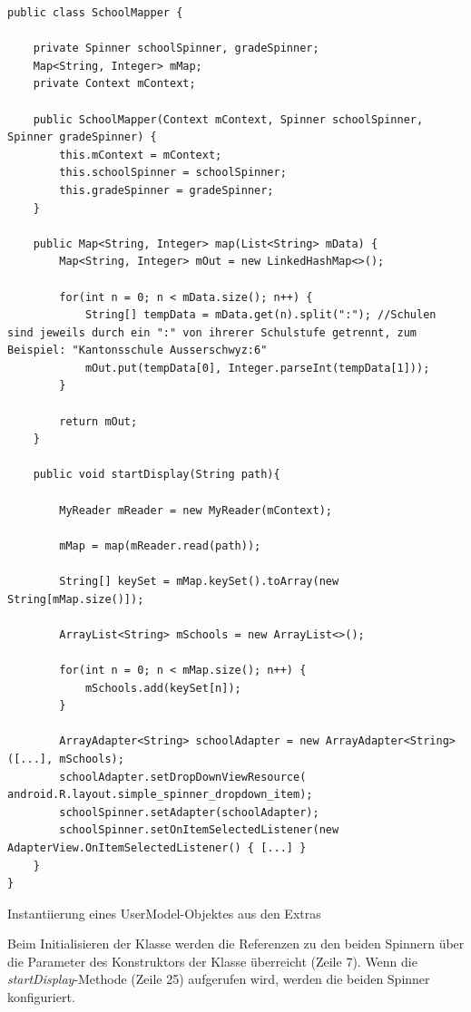 \documentclass[../main.tex]{subfiles}
\begin{document}
\begin{code}
	\begin{center}
		\begin{verbatim}
public class SchoolMapper {

	private Spinner schoolSpinner, gradeSpinner;
	Map<String, Integer> mMap;
	private Context mContext;

	public SchoolMapper(Context mContext, Spinner schoolSpinner, Spinner gradeSpinner) {
		this.mContext = mContext;
		this.schoolSpinner = schoolSpinner;
		this.gradeSpinner = gradeSpinner;
	}

	public Map<String, Integer> map(List<String> mData) {
		Map<String, Integer> mOut = new LinkedHashMap<>();

		for(int n = 0; n < mData.size(); n++) {
			String[] tempData = mData.get(n).split(":"); //Schulen sind jeweils durch ein ":" von ihrerer Schulstufe getrennt, zum Beispiel: "Kantonsschule Ausserschwyz:6"
			mOut.put(tempData[0], Integer.parseInt(tempData[1]));
		}
		
		return mOut;
	}

	public void startDisplay(String path){

		MyReader mReader = new MyReader(mContext);

		mMap = map(mReader.read(path));
	
		String[] keySet = mMap.keySet().toArray(new String[mMap.size()]);

		ArrayList<String> mSchools = new ArrayList<>();

		for(int n = 0; n < mMap.size(); n++) {
			mSchools.add(keySet[n]);
		}

		ArrayAdapter<String> schoolAdapter = new ArrayAdapter<String>([...], mSchools);
		schoolAdapter.setDropDownViewResource( android.R.layout.simple_spinner_dropdown_item);
		schoolSpinner.setAdapter(schoolAdapter);
		schoolSpinner.setOnItemSelectedListener(new AdapterView.OnItemSelectedListener() { [...] }
	}
}	
		\end{verbatim}
		\caption{Instantiierung eines UserModel-Objektes aus den Extras}
		\label{schoolMapper}
	\end{center}
\end{code}

	Beim Initialisieren der Klasse werden die Referenzen zu den beiden Spinnern über die Parameter des Konstruktors der Klasse überreicht (Zeile 7). Wenn die \emph{startDisplay}-Methode (Zeile 25) aufgerufen wird, werden die beiden Spinner konfiguriert. 
	
\end{document}
